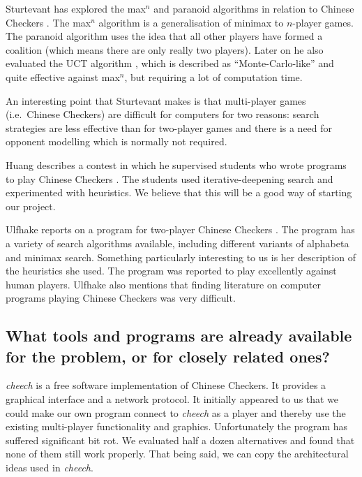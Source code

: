 \documentclass[a4paper,11pt]{article}
\begin{document}
Sturtevant has explored the max$^n$ and paranoid algorithms in
relation to Chinese Checkers
\cite{springerlink:10.1007/978-3-540-40031-8_8}. The max$^n$ algorithm
is a generalisation of minimax to $n$-player games. The paranoid
algorithm uses the idea that all other players have formed a coalition
(which means there are only really two players). Later on he also
evaluated the UCT algorithm
\cite{springerlink:10.1007/978-3-540-87608-3_4}, which is described as
``Monte-Carlo-like'' and quite effective against max$^n$, but
requiring a lot of computation time.

An interesting point that Sturtevant makes is that multi-player games
(i.e.~Chinese Checkers) are difficult for computers for two reasons:
search strategies are less effective than for two-player games and
there is a need for opponent modelling which is normally not required.

Huang describes a contest in which he supervised students who wrote
programs to play Chinese Checkers \cite{Huang:2001:SGP:378593.378708}.
The students used iter\-ative-deep\-ening search and experimented with
heuristics. We believe that this will be a good way of starting our
project.

Ulfhake reports on a program for two-player Chinese Checkers
\cite{ulfhake}. The program has a variety of search algorithms
available, including different variants of alphabeta and minimax
search. Something particularly interesting to us is her description of
the heuristics she used. The program was reported to play excellently
against human players. Ulfhake also mentions that finding literature
on computer programs playing Chinese Checkers was very difficult.


\subsection{What tools and programs are already available for the problem, or for closely related ones?}

\emph{cheech} is a free software implementation of Chinese Checkers.
It provides a graphical interface and a network protocol. It initially
appeared to us that we could make our own program connect to
\emph{cheech} as a player and thereby use the existing multi-player
functionality and graphics. Unfortunately the program has suffered
significant bit rot. We evaluated half a dozen alternatives and found
that none of them still work properly. That being said, we can copy
the architectural ideas used in \emph{cheech}.
\end{document}
